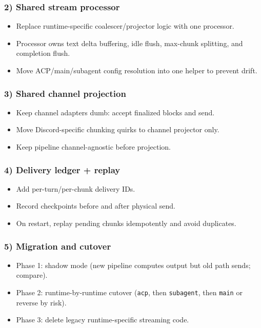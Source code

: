 \subsubsection{2) Shared stream processor}


\begin{itemize}
  \item Replace runtime-specific coalescer/projector logic with one processor.
  \item Processor owns text delta buffering, idle flush, max-chunk splitting, and completion flush.
  \item Move ACP/main/subagent config resolution into one helper to prevent drift.
\end{itemize}


\subsubsection{3) Shared channel projection}


\begin{itemize}
  \item Keep channel adapters dumb: accept finalized blocks and send.
  \item Move Discord-specific chunking quirks to channel projector only.
  \item Keep pipeline channel-agnostic before projection.
\end{itemize}


\subsubsection{4) Delivery ledger + replay}


\begin{itemize}
  \item Add per-turn/per-chunk delivery IDs.
  \item Record checkpoints before and after physical send.
  \item On restart, replay pending chunks idempotently and avoid duplicates.
\end{itemize}


\subsubsection{5) Migration and cutover}


\begin{itemize}
  \item Phase 1: shadow mode (new pipeline computes output but old path sends; compare).
  \item Phase 2: runtime-by-runtime cutover (\texttt{acp}, then \texttt{subagent}, then \texttt{main} or reverse by risk).
  \item Phase 3: delete legacy runtime-specific streaming code.
\end{itemize}


